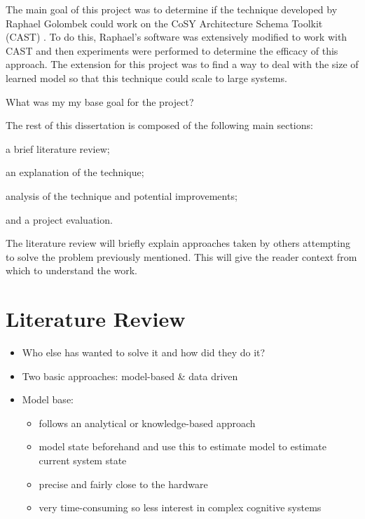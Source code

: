 \documentclass[11pt,a4paper]{article}
\begin{document}
The main goal of this project was to determine if the technique
developed by Raphael Golombek \cite{Golombek2011} could work on the
CoSY Architecture Schema Toolkit (CAST) \cite{haweswyatt10aei}. To do
this, Raphael's software was extensively modified to work with CAST
and then experiments were performed to determine the efficacy of this
approach. The extension for this project was to find a way to deal
with the size of learned model so that this technique could scale to
large systems.

\noindent What was my my base goal for the project?

The rest of this dissertation is composed of the following main
sections:
\begin{inparaenum}
\item a brief literature review;
\item an explanation of the technique;
\item analysis of the technique and potential improvements;
\item and a project evaluation.
\end{inparaenum} The literature review will briefly explain approaches
taken by others attempting to solve the problem previously mentioned.
This will give the reader context from which to understand the work.


\section{Literature Review}
\label{cha:lit-review}

\begin{itemize}
\item Who else has wanted to solve it and how did they do it?
\item Two basic approaches: model-based \& data driven
\item Model base:
  \begin{itemize}
  \item follows an analytical or knowledge-based approach
  \item model state beforehand and use this to estimate model to
    estimate current system state
  \item precise and fairly close to the hardware
  \item very time-consuming so less interest in complex cognitive
    systems
  \end{itemize}
\end{itemize}
\end{document}
